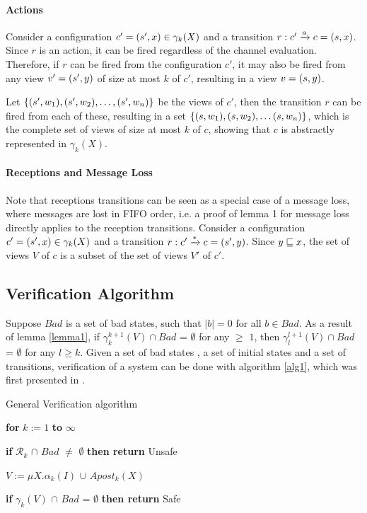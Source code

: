 \paragraph{Actions}
Consider a configuration $c' = (s', x) \in \gamma_k(X)$ and a transition $r: c' \xrightarrow{a} c = (s, x)$. Since $r$ is an action, it can be fired regardless of the channel evaluation. Therefore, if $r$ can be fired from the configuration $c'$, it may also be fired from any view $v' = (s', y)$ of size at most $k$ of $c'$, resulting in a view $v =  (s, y)$.

Let $\{(s', w_1), (s', w_2), \ldots,  (s', w_n)\}$ be the views of $c'$, then the transition $r$ can be fired from each of these, resulting in a set $\{(s, w_1), (s, w_2),\ldots (s, w_n)\}$, which is the complete set of views of size at most $k$ of $c$, showing that $c$ is abstractly represented in $\gamma_k(X)$.

\paragraph{Receptions and Message Loss}
Note that receptions transitions can be seen as a special case of a message loss, where messages are lost in FIFO order, i.e. a proof of lemma 1 for message loss directly applies to the reception transitions. Consider a configuration $c' = (s', x) \in \gamma_k(X)$ and a transition $r: c' \xrightarrow{*} c = (s', y)$. Since $y \sqsubseteq x$, the set of views $V$ of $c$ is a subset of the set of views $V'$ of $c'$.

\subsection{Verification Algorithm}
\label{verificationalgorithm}
Suppose $Bad$ is a set of bad states, such that $|b| = 0$ for all $b \in Bad$. As a result of lemma \ref{lemma1}, if $\gamma_k^{k+1}(V) \cap Bad$ = $\emptyset$ for any  $\geq$ $1$, then $\gamma_l^{l+1}(V) \cap Bad$ = $\emptyset$ for any $l \geq k$. Given a set of bad states , a set of initial states  and a set of transitions, verification of a system can be done with algorithm \ref{alg1}, which was first presented in \cite{parosh}.

\begin{algorithm}
  \caption{General Verification algorithm}
  \label{alg1}
    \hspace{8pt}\textbf{for} $k := 1$ \textbf{to} $\infty$

    \hspace{16pt}\textbf{if} $\mathcal{R}_k$ $\cap$ $Bad$ $\neq$ $\emptyset$ \textbf{then return} Unsafe

    \hspace{16pt}$V := \mu X.\alpha_k(I)$ $\cup$ $Apost_k(X)$

    \hspace{16pt}\textbf{if} {$\gamma_k(V)$ $\cap$ $Bad$ = $\emptyset$} \textbf{then return} Safe
\end{algorithm}

